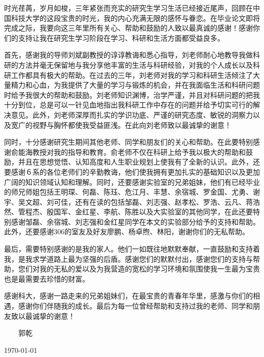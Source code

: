 ﻿
\begin{thanks}

\par 时光荏苒，岁月如梭，三年紧张而充实的研究生学习生活已经接近尾声，回顾在中国科技大学的这段宝贵的时光，我的内心充满无限的感怀与眷恋。在毕业论文即将完成之际，我要向这三年里所有关心、帮助和鼓励的人致以最真诚的感谢！感谢你们的支持让我在研究生学习阶段在学习、科研和生活方面都受益良多。
\par 首先，感谢我的导师刘斌副教授的谆谆教诲和悉心指导，刘老师耐心地教导我做科研的方法并毫无保留地与我分享他丰富的生活与科研经验，对我的个人成长以及科研工作都具有极大的帮助。在过去的三年，刘老师对我的学习和科研生活倾注了大量精力和心血，为我提供了大量的学习与锻炼的机会，并在我面临生活和科研问题时给予我很大的帮助和鼓励。刘老师知识渊博，治学严谨，并且对科研问题的把我十分到位，总是可以一针见血地指出我科研工作中存在的问题并给予切实可行的解决意见。此外，刘老师深厚而扎实的学识功底、严谨的研究态度、敏锐的洞察力以及宽广的视野与胸怀都使我受益匪浅。在此向刘老师致以最诚挚的谢意！
\par 同时，十分感谢研究生期间其他老师、同学和朋友们的关心和帮助。在此要特别感谢俞能海教授对我的指导和教育。俞老师不仅在科研上给予我以极大的帮助和鼓励，并且在思想觉悟、认知高度和人生职业规划上使我有了全新的认识。此外，还要感谢６系的各位老师们的辛勤教诲，他们使我拥有更加扎实的基础知识以及更加广阔的知识领域认知和理解。同时，还要感谢实验室的兄弟姐妹，他们有已经毕业的师兄师姐包括王明琛、何磊、陈珏、危江月、丰慧、余宿城、罗金国、尤勇、谢宇、吴文超、刘可佳，还有在读的包括邹磊、刘志强、赵孝松、罗浩、云凡、蒋浩然、管程杰、殷国军、金红星、李航、陈胜以及大实验室的其他同学，在此还要特别感谢邹磊、余宿城、刘志强和金红星同学在本文的实验部分给予的支持和帮助。此外，还要感谢306的室友及好友廖鹏、杨卓煦、林阳，谢谢你们的无私帮助。
\par 最后，需要特别感谢的是我的家人。他们一如既往地默默奉献，一直鼓励和支持着我，是我求学道路上最为坚强的后盾。感谢您们的默默付出，感谢您们的支持与帮助，您们对我的无私的爱以及为我营造的宽松的学习环境和氛围使我一生最为宝贵也是最需要去珍惜的财富。
\par 感谢科大，感谢一路走来的兄弟姐妹们，在最宝贵的青春年华里，感激与你们的相遇，感谢你们伴随我的成长。最后为每一位曾经帮助和支持过我的老师、同学和朋友致以最诚挚的谢意！

\vskip 10pt

\begin{flushright}
~~~~郭乾~~~~

\today

\end{flushright}
\end{thanks}
